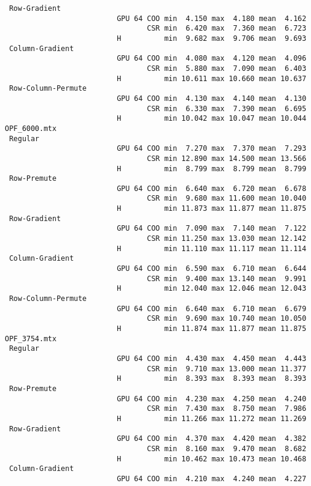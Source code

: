 {\begin{verbatim}
 Row-Gradient
                          GPU 64 COO min  4.150 max  4.180 mean  4.162
                                 CSR min  6.420 max  7.360 mean  6.723
                          H          min  9.682 max  9.706 mean  9.693
 Column-Gradient
                          GPU 64 COO min  4.080 max  4.120 mean  4.096
                                 CSR min  5.880 max  7.090 mean  6.403
                          H          min 10.611 max 10.660 mean 10.637
 Row-Column-Permute
                          GPU 64 COO min  4.130 max  4.140 mean  4.130
                                 CSR min  6.330 max  7.390 mean  6.695
                          H          min 10.042 max 10.047 mean 10.044
OPF_6000.mtx
 Regular
                          GPU 64 COO min  7.270 max  7.370 mean  7.293
                                 CSR min 12.890 max 14.500 mean 13.566
                          H          min  8.799 max  8.799 mean  8.799
 Row-Premute
                          GPU 64 COO min  6.640 max  6.720 mean  6.678
                                 CSR min  9.680 max 11.600 mean 10.040
                          H          min 11.873 max 11.877 mean 11.875
 Row-Gradient
                          GPU 64 COO min  7.090 max  7.140 mean  7.122
                                 CSR min 11.250 max 13.030 mean 12.142
                          H          min 11.110 max 11.117 mean 11.114
 Column-Gradient
                          GPU 64 COO min  6.590 max  6.710 mean  6.644
                                 CSR min  9.400 max 13.140 mean  9.991
                          H          min 12.040 max 12.046 mean 12.043
 Row-Column-Permute
                          GPU 64 COO min  6.640 max  6.710 mean  6.679
                                 CSR min  9.690 max 10.740 mean 10.050
                          H          min 11.874 max 11.877 mean 11.875
OPF_3754.mtx
 Regular
                          GPU 64 COO min  4.430 max  4.450 mean  4.443
                                 CSR min  9.710 max 13.000 mean 11.377
                          H          min  8.393 max  8.393 mean  8.393
 Row-Premute
                          GPU 64 COO min  4.230 max  4.250 mean  4.240
                                 CSR min  7.430 max  8.750 mean  7.986
                          H          min 11.266 max 11.272 mean 11.269
 Row-Gradient
                          GPU 64 COO min  4.370 max  4.420 mean  4.382
                                 CSR min  8.160 max  9.470 mean  8.682
                          H          min 10.462 max 10.473 mean 10.468
 Column-Gradient
                          GPU 64 COO min  4.210 max  4.240 mean  4.227

\end{verbatim}}
